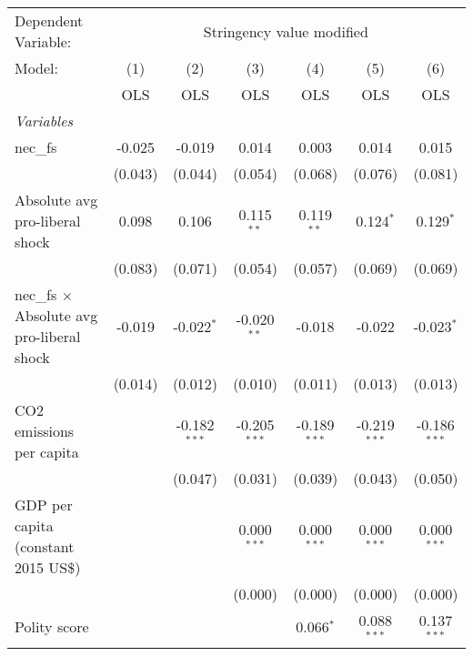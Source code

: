 
\begingroup
\centering
\begin{tabular}{lcccccc}
   \toprule
   Dependent Variable: & \multicolumn{6}{c}{Stringency value modified}\\
   Model:                                            & (1)     & (2)            & (3)            & (4)            & (5)            & (6)\\  
                                                     &  OLS    & OLS            & OLS            & OLS            & OLS            & OLS\\  
   \midrule
   \emph{Variables}\\
   nec\_fs                                           & -0.025  & -0.019         & 0.014          & 0.003          & 0.014          & 0.015\\   
                                                     & (0.043) & (0.044)        & (0.054)        & (0.068)        & (0.076)        & (0.081)\\   
   Absolute avg pro-liberal shock                    & 0.098   & 0.106          & 0.115$^{**}$   & 0.119$^{**}$   & 0.124$^{*}$    & 0.129$^{*}$\\   
                                                     & (0.083) & (0.071)        & (0.054)        & (0.057)        & (0.069)        & (0.069)\\   
   nec\_fs $\times$ Absolute avg pro-liberal shock   & -0.019  & -0.022$^{*}$   & -0.020$^{**}$  & -0.018         & -0.022         & -0.023$^{*}$\\   
                                                     & (0.014) & (0.012)        & (0.010)        & (0.011)        & (0.013)        & (0.013)\\   
   CO2 emissions per capita                          &         & -0.182$^{***}$ & -0.205$^{***}$ & -0.189$^{***}$ & -0.219$^{***}$ & -0.186$^{***}$\\   
                                                     &         & (0.047)        & (0.031)        & (0.039)        & (0.043)        & (0.050)\\   
   GDP per capita (constant 2015 US\$)               &         &                & 0.000$^{***}$  & 0.000$^{***}$  & 0.000$^{***}$  & 0.000$^{***}$\\   
                                                     &         &                & (0.000)        & (0.000)        & (0.000)        & (0.000)\\   
   Polity score                                      &         &                &                & 0.066$^{*}$    & 0.088$^{***}$  & 0.137$^{***}$\\   

\end{tabular}
